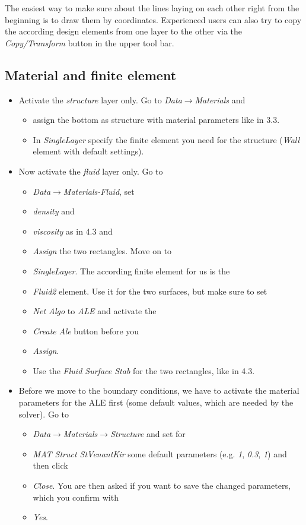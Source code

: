 The easiest way to make sure about the lines laying on each other
right from the beginning is to draw them by coordinates. Experienced
users can also try to copy the according design elements from one
layer to the other via the \emph{Copy/Transform} button in the upper
tool bar. 


\subsection{Material and finite element}

\begin{itemize}
\item Activate the \emph{structure} layer only. Go to \emph{Data$\to$Materials}
and 

\begin{itemize}
\item assign the bottom as structure with material parameters like in 3.3. 
\item In \emph{SingleLayer} specify the finite element you need for the
structure (\emph{Wall} element with default settings).
\end{itemize}
\item Now activate the \emph{fluid} layer only. Go to 

\begin{itemize}
\item \emph{Data$\to$Materials-Fluid}, set 
\item \emph{density} and 
\item \emph{viscosity} as in 4.3 and 
\item \emph{Assign} the two rectangles. Move on to 
\item \emph{SingleLayer}. The according finite element for us is the 
\item \emph{Fluid2} element. Use it for the two surfaces, but make sure
to set 
\item \emph{Net Algo} to \emph{ALE} and activate the 
\item \emph{Create Ale} button before you 
\item \emph{Assign}. 
\item Use the \emph{Fluid Surface Stab} for the two rectangles, like in
4.3.
\end{itemize}
\item Before we move to the boundary conditions, we have to activate the
material parameters for the ALE first (some default values, which
are needed by the solver). Go to

\begin{itemize}
\item \emph{Data$\to$Materials$\to$Structure} and set for 
\item \emph{MAT Struct StVenantKir} some default parameters (e.g. \emph{1},
\emph{0.3}, \emph{1}) and then click 
\item \emph{Close}. You are then asked if you want to save the changed parameters,
which you confirm with \emph{}
\item \emph{Yes}.
\end{itemize}
\end{itemize}
